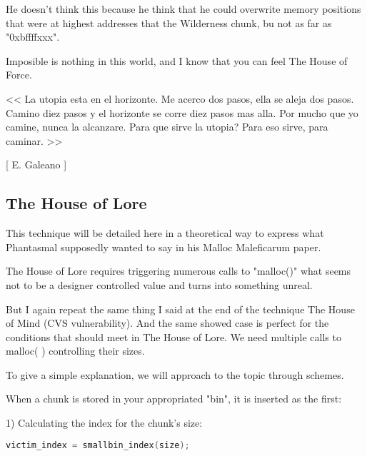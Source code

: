 \documentclass[12pt]{article}
\begin{document}
He doesn't think this because he think that he could overwrite memory
positions that were at highest addresses that the Wilderness chunk, bu
not as far as "0xbffffxxx".
\newline


Imposible is nothing in this world, and I know that you can feel The House
of Force.


\begin{verbnobox}[\small]
               << La utopia esta en el horizonte. Me
                  acerco dos pasos, ella se aleja dos
                  pasos. Camino diez pasos y el horizonte
                  se corre diez pasos mas alla. Por
                  mucho que yo camine, nunca la alcanzare.
                  Para que sirve la utopia? Para eso
                  sirve, para caminar. >>

                                            [ E. Galeano ]

\end{verbnobox}

\subsection{The House of Lore}

	
This technique will be detailed here in a theoretical way to express what
Phantasmal supposedly wanted to say in his Malloc Maleficarum paper.
\newline


The House of Lore requires triggering numerous calls to "malloc()" what
seems not to be a designer controlled value and turns into something
unreal.
\newline


But I again repeat the same thing I said at the end of the technique The
House of Mind (CVS vulnerability). And the same showed case is perfect for
the conditions that should meet in The House of Lore. We need multiple
calls to malloc( ) controlling their sizes.
\newline


To give a simple explanation, we will approach to the topic through
schemes.
\newline


When a chunk is stored in your appropriated "bin", it is inserted as the
first:

       1) Calculating the index for the chunk's size:
\begin{lstlisting}[language=C]
             victim_index = smallbin_index(size);
\end{lstlisting}
\end{document}
